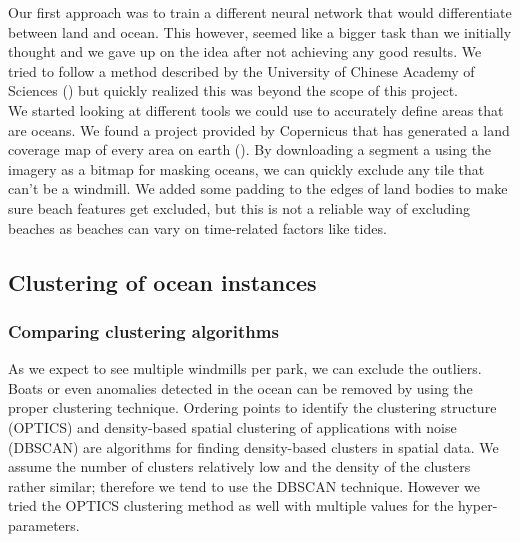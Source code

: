 Our first approach was to train a different neural network that would differentiate between land and ocean. This however, seemed like a bigger task than we initially thought and we gave up on the idea after not achieving any good results. We tried to follow a method described by the University of Chinese Academy of Sciences (\cite{rs10122053}) but quickly realized this was beyond the scope of this project.\\

We started looking at different tools we could use to accurately define areas that are oceans. We found a project provided by Copernicus that has generated a land coverage map of every area on earth (\cite{copernicus}). By downloading a segment a using the imagery as a bitmap for masking oceans, we can quickly exclude any tile that can't be a windmill. We added some padding to the edges of land bodies to make sure beach features get excluded, but this is not a reliable way of excluding beaches as beaches can vary on time-related factors like tides.

\subsection{Clustering of ocean instances}

\subsubsection{Comparing clustering algorithms}

As we expect to see multiple windmills per park, we can exclude the outliers. Boats or even anomalies detected in the ocean can be removed by using the proper clustering technique. Ordering points to identify the clustering structure (OPTICS) and density-based spatial clustering of applications with noise (DBSCAN) are algorithms for finding density-based clusters in spatial data. We assume the number of clusters relatively low and the density of the clusters rather similar; therefore we tend to use the DBSCAN technique. However we tried the OPTICS clustering method as well with multiple values for the hyper-parameters. 

